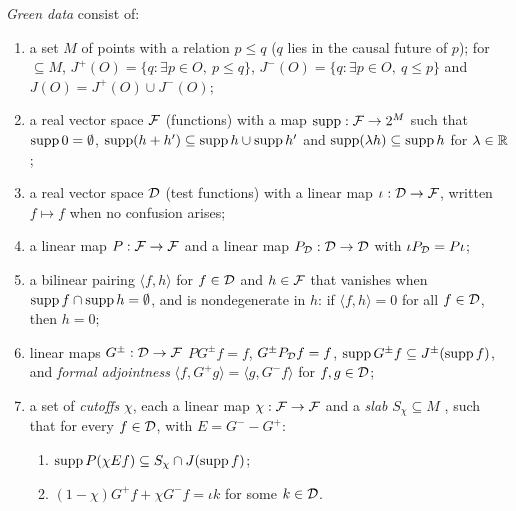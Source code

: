 \begin{definition}\label{def:green-data}
\emph{Green data} consist of:
\begin{enumerate}[label=(G\arabic*),leftmargin=3em]
\item a set $M$ of points with a relation $p\leq q$ ($q$ lies in the causal future of $p$); for
$\subseteq M$, $J^+(O)=\{q:\exists p\in O,\ p\leq q\}$, $J^-(O)=\{q:\exists p\in O,\ q\leq p\}$
and $J(O)=J^+(O)\cup J^-(O)$;
\item a real vector space $\mathcal F$ (functions) with a map $\operatorname{supp}:\mathcal F\to2^M$ such that
$\operatorname{supp}0=\emptyset$, $\operatorname{supp}(h+h')\subseteq\operatorname{supp} h\cup\operatorname{supp} h'$ and $\operatorname{supp}(\lambda h)\subseteq\operatorname{supp} h$ for
$\lambda\in\mathbb R$;
\item a real vector space $\mathcal D$ (test functions) with a linear map $\iota:\mathcal D\to\mathcal F$, written
$f\mapsto f$ when no confusion arises;
\item a linear map $P:\mathcal F\to\mathcal F$ and a linear map $P_\mathcal D:\mathcal D\to\mathcal D$ with $\iota P_\mathcal D=P\iota$;
\item a bilinear pairing $\langle f,h\rangle$ for $f\in\mathcal D$ and $h\in\mathcal F$ that vanishes when
$\operatorname{supp} f\cap\operatorname{supp} h=\emptyset$, and is nondegenerate in $h$: if $\langle f,h\rangle=0$ for all
$f\in\mathcal D$, then $h=0$;
\item linear maps $G^\pm:\mathcal D\to\mathcal F$  $PG^\pm f=f$, $G^\pm P_\mathcal D f=f$,
$\operatorname{supp} G^\pm f\subseteq J^\pm(\operatorname{supp} f)$, and \emph{formal adjointness}
$\langle f,G^+g\rangle=\langle g,G^-f\rangle$ for $f,g\in\mathcal D$;
\item a set of \emph{cutoffs} $\chi$, each  a linear map $\chi:\mathcal F\to\mathcal F$ and a \emph{slab}
$S_\chi\subseteq M$ , such that for
every $f\in\mathcal D$, with $E=G^--G^+$:
\begin{enumerate}[label=(c\arabic*),leftmargin=2.5em]
\item $\operatorname{supp} P(\chi Ef)\subseteq S_\chi\cap J(\operatorname{supp} f)$;
\item $(1-\chi)G^+f+\chi G^-f=\iota k$ for some $k\in\mathcal D$.
\end{enumerate}
\end{enumerate}
\end{definition}
\noindent{}

